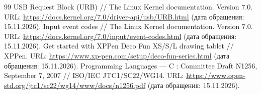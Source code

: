 \begin{thebibliography}{99}
 USB Request Block (URB) // The Linux Kernel documentation. Version 7.0. URL: \url{https://docs.kernel.org/7.0/driver-api/usb/URB.html} (дата обращения: 15.11.2026).
 Input event codes // The Linux Kernel documentation. Version 7.0. URL: \url{https://docs.kernel.org/7.0/input/event-codes.html} (дата обращения: 15.11.2026).
 Get started with XPPen Deco Fun XS/S/L drawing tablet // XPPen. URL: \url{https://www.xp-pen.com/setup/deco-fun-series.html} (дата обращения: 15.11.2026).
 Programming Languages --- C : Committee Draft N1256, September 7, 2007 // ISO/IEC JTC1/SC22/WG14. URL: \url{https://www.open-std.org/jtc1/sc22/wg14/www/docs/n1256.pdf} (дата обращения: 15.11.2026).
\end{thebibliography}
\endgroup
\clearpage
